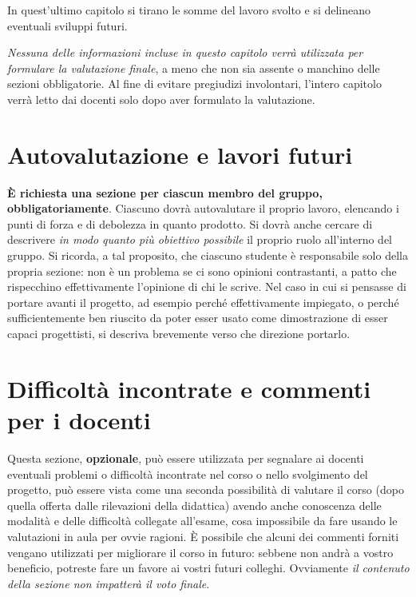 \documentclass[a4paper,12pt]{report}
\begin{document}
In quest'ultimo capitolo si tirano le somme del lavoro svolto e si delineano eventuali sviluppi
futuri.

\textit{Nessuna delle informazioni incluse in questo capitolo verrà utilizzata per formulare la valutazione finale}, a meno che non sia assente o manchino delle sezioni obbligatorie.
%
Al fine di evitare pregiudizi involontari, l'intero capitolo verrà letto dai docenti solo dopo aver formulato la valutazione.

\section{Autovalutazione e lavori futuri}

\textbf{È richiesta una sezione per ciascun membro del gruppo, obbligatoriamente}.
%
Ciascuno dovrà autovalutare il proprio lavoro, elencando i punti di forza e di debolezza in quanto prodotto.
Si dovrà anche cercare di descrivere \emph{in modo quanto più obiettivo possibile} il proprio ruolo all'interno del gruppo.
Si ricorda, a tal proposito, che ciascuno studente è responsabile solo della propria sezione: non è un problema se ci sono opinioni contrastanti, a patto che rispecchino effettivamente l'opinione di chi le scrive.
Nel caso in cui si pensasse di portare avanti il progetto, ad esempio perché effettivamente impiegato, o perché sufficientemente ben riuscito da poter esser usato come dimostrazione di esser capaci progettisti, si descriva brevemente verso che direzione portarlo.

\section{Difficoltà incontrate e commenti per i docenti}

Questa sezione, \textbf{opzionale}, può essere utilizzata per segnalare ai docenti eventuali problemi o difficoltà incontrate nel corso o nello svolgimento del progetto, può essere vista come una seconda possibilità di valutare il corso (dopo quella offerta dalle rilevazioni della didattica) avendo anche conoscenza delle modalità e delle difficoltà collegate all'esame, cosa impossibile da fare usando le valutazioni in aula per ovvie ragioni.
%
È possibile che alcuni dei commenti forniti vengano utilizzati per migliorare il corso in futuro: sebbene non andrà a vostro beneficio, potreste fare un favore ai vostri futuri colleghi.
%
Ovviamente \textit{il contenuto della sezione non impatterà il voto finale}.

\appendix
\end{document}

